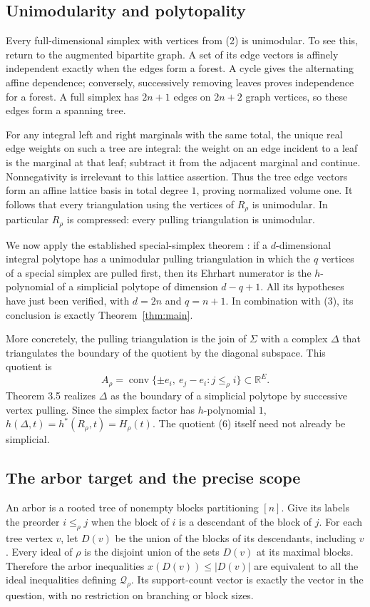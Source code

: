 \documentclass[11pt]{article}
\newcommand{\Q}{\mathcal Q}
\newcommand{\conv}{\operatorname{conv}}
\begin{document}
\subsection*{Unimodularity and polytopality}
Every full-dimensional simplex with vertices from (2) is unimodular.
To see this, return to the augmented bipartite graph. A set of its
edge vectors is affinely independent exactly when the edges form a
forest. A cycle gives the alternating affine dependence; conversely,
successively removing leaves proves independence for a forest.
A full simplex has $2n+1$ edges on $2n+2$ graph vertices, so these
edges form a spanning tree.

For any integral left and right marginals with the same total, the
unique real edge weights on such a tree are integral: the weight on
an edge incident to a leaf is the marginal at that leaf; subtract it
from the adjacent marginal and continue. Nonnegativity is irrelevant
to this lattice assertion. Thus the tree edge vectors form an affine
lattice basis in total degree $1$, proving normalized volume one.
It follows that every triangulation using the vertices of $R_\rho$
is unimodular. In particular $R_\rho$ is compressed: every pulling
triangulation is unimodular.

We now apply the established special-simplex theorem
\cite[Theorem 3.5]{A}: if a $d$-dimensional integral polytope has a
unimodular pulling triangulation in which the $q$ vertices of a
special simplex are pulled first, then its Ehrhart numerator is the
$h$-polynomial of a simplicial polytope of dimension $d-q+1$.
All its hypotheses have just been verified, with $d=2n$ and $q=n+1$.
In combination with (3), its conclusion is exactly Theorem~\ref{thm:main}.

More concretely, the pulling triangulation is the join of $\Sigma$
with a complex $\Delta$ that triangulates the boundary of the quotient
by the diagonal subspace. This quotient is
\[
 A_\rho=\conv\{\pm e_i,\ e_j-e_i:j\le_\rho i\}\subset\mathbb R^E.
                                                                    \tag{6}
\]
Theorem 3.5 realizes $\Delta$ as the boundary of a simplicial polytope
by successive vertex pulling. Since the simplex factor has
$h$-polynomial $1$, $h(\Delta,t)=h^*(R_\rho,t)=H_\rho(t)$.
The quotient (6) itself need not already be simplicial.

\subsection*{The arbor target and the precise scope}
An arbor is a rooted tree of nonempty blocks partitioning $[n]$.
Give its labels the preorder $i\le_\rho j$ when the block of $i$
is a descendant of the block of $j$. For each tree vertex $v$, let
$D(v)$ be the union of the blocks of its descendants, including $v$.
Every ideal of $\rho$ is the disjoint union of the sets $D(v)$
at its maximal blocks. Therefore the arbor inequalities
$x(D(v))\le|D(v)|$ are equivalent to all the ideal inequalities
defining $\Q_\rho$. Its support-count vector is exactly the vector
in the question, with no restriction on branching or block sizes.
\end{document}
